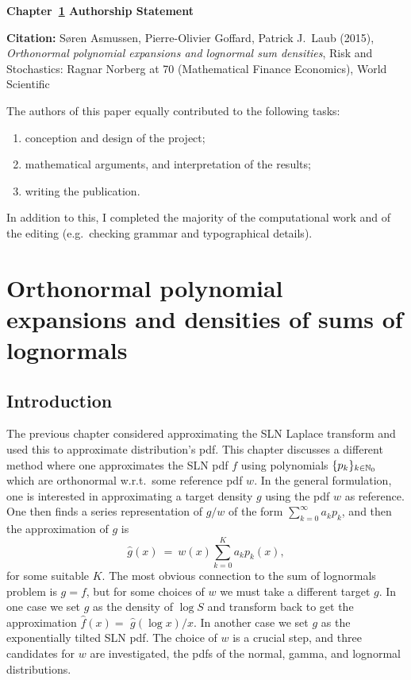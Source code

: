 \vspace*{\fill}

{\large \bf Chapter~\ref{chp:sln_orth_pdf} Authorship Statement}

\vspace{1em}

{\bf Citation:} S{\o}ren Asmussen, Pierre-Olivier Goffard, Patrick J.\ Laub (2015), \emph{Orthonormal polynomial expansions and lognormal sum densities}, Risk and Stochastics: Ragnar Norberg at 70 (Mathematical Finance Economics), World Scientific

\vspace{1em}

The authors of this paper equally contributed to the following tasks:
\begin{enumerate}
\item conception and design of the project;
\item mathematical arguments, and interpretation of the results;
\item writing the publication.
\end{enumerate}

In addition to this, I completed the majority of the computational work and of the editing (e.g.\ checking grammar and typographical details).

\vspace{3em}

\vspace*{\fill}

\chapter{Orthonormal polynomial expansions and densities of sums of lognormals} \label{chp:sln_orth_pdf}

\section{Introduction}\label{S:SLN_Ortho_PDF_Intr}

The previous chapter considered approximating the SLN Laplace transform and used this to approximate distribution's pdf. This chapter discusses a different method where one approximates the SLN pdf $f$ using polynomials $\{p_k\}_{k\in\mathbb{N}_0}$ which are orthonormal w.r.t.\ some reference pdf $w$. In the general formulation, one is interested in approximating a target density $g$ using the pdf $w$ as reference.
One then finds
a series representation of $g/w$ of the form $\sum_{k=0}^\infty a_k p_k$,
and then the approximation of $g$ is
\begin{equation} \label{orthog_approx}
	\widehat{g}(x)\ =\ w(x) \sum_{k=0}^K a_k p_k(x),
\end{equation}
for some suitable $K$.
The most obvious connection to the sum of lognormals problem is $g=f$, but for some choices of $w$ we must take a different target $g$. In one case we set $g$ as the density of $\log S$ and transform back to get the approximation $\widehat{f}(x)=$
$\widehat{g}(\log x)/x$. In another case we set $g$ as the exponentially tilted SLN pdf.
The choice of $w$ is a crucial step, and three candidates for $w$ are investigated, the pdfs of the normal, gamma, and lognormal distributions.

